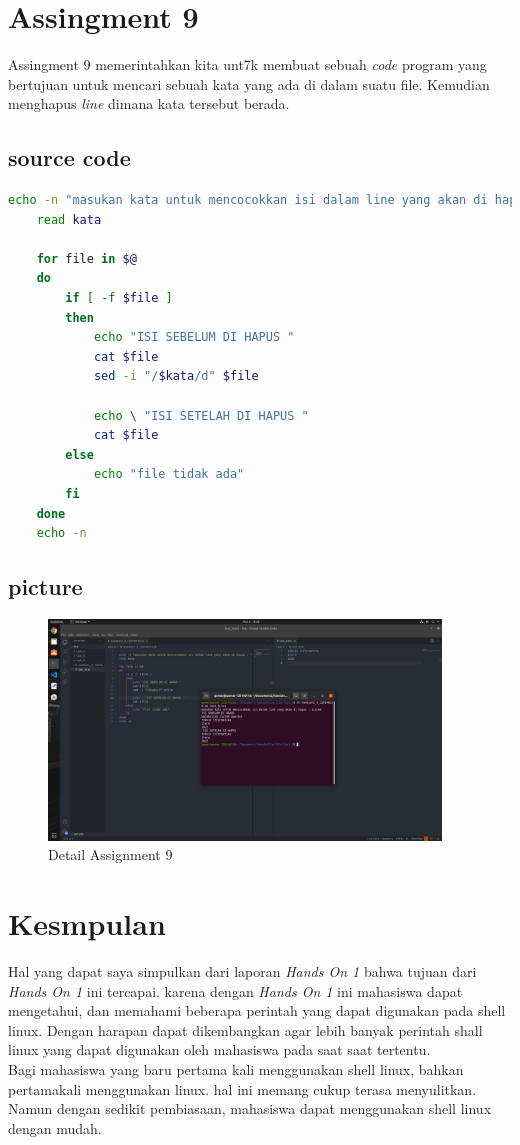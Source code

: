 \documentclass[11pt,a4paper]{article}
\begin{document}
\newpage
\section{Assingment 9}
Assingment 9 memerintahkan kita unt7k membuat sebuah \textit{code} program yang bertujuan untuk mencari sebuah kata yang ada di dalam suatu file.
Kemudian menghapus \textit{line} dimana kata tersebut berada.
\subsection*{source code}
\begin{lstlisting}[language=bash, caption={source code Assingment 9}]
	echo -n "masukan kata untuk mencocokkan isi dalam line yang akan di hapus : "
	read kata

	for file in $@
	do
		if [ -f $file ]
		then
			echo "ISI SEBELUM DI HAPUS "
			cat $file
			sed -i "/$kata/d" $file

			echo \ "ISI SETELAH DI HAPUS "
			cat $file
		else 
			echo "file tidak ada"
		fi
	done
	echo -n
\end{lstlisting}

\subsection*{picture}
\begin{figure}[h]
	\centering
	\includegraphics[width=0.93\textwidth]{figure/task_9.png}
	\caption{Detail Assignment 9}
\end{figure}


\newpage
\section{Kesmpulan}
Hal yang dapat saya simpulkan dari laporan \textit{Hands On 1} bahwa tujuan dari \textit{Hands On 1} ini tercapai. karena dengan \textit{Hands On 1} ini mahasiswa dapat mengetahui, dan memahami beberapa perintah yang dapat digunakan pada shell linux.
Dengan harapan dapat dikembangkan agar lebih banyak perintah shall linux yang dapat digunakan oleh mahasiswa pada saat saat tertentu.\\
Bagi mahasiswa yang baru pertama kali menggunakan shell linux, bahkan pertamakali menggunakan linux. hal ini memang cukup terasa menyulitkan. Namun dengan sedikit pembiasaan, mahasiswa dapat menggunakan shell linux dengan mudah.
\end{document}
